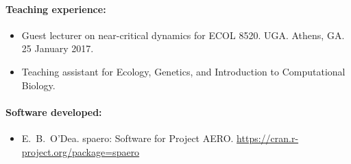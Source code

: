 \documentclass[a4paper]{article}
\begin{document}
\paragraph{Teaching experience:}

\begin{itemize}
  \item[~] Guest lecturer on near-critical dynamics for ECOL 8520. UGA. Athens, GA. 25 January 2017.
  \item[~] Teaching assistant for Ecology, Genetics, and Introduction to Computational Biology.
\end{itemize}

\paragraph{Software developed:}
\begin{itemize}
  \item[~] E.\ B.\ O'Dea. spaero: Software for Project
    AERO. \url{https://cran.r-project.org/package=spaero}
\end{itemize}
\end{document}
